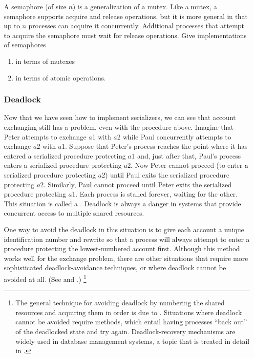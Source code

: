 \begin{exercise}
	\label{Exercise 3.47}
	A semaphore (of size \( n \)) is a generalization of a mutex.
	Like a mutex, a semaphore supports acquire and release operations, but it is more general in that up to \( n \) processes can acquire it concurrently.
	Additional processes that attempt to acquire the semaphore must wait for release operations.
	Give implementations of semaphores
	\begin{enumerate}[label = \alph*., leftmargin = *]

		\item
			in terms of mutexes

		\item
			in terms of atomic  operations.

	\end{enumerate}
\end{exercise}



\subsubsection*{Deadlock}

Now that we have seen how to implement serializers, we can see that account exchanging still has a problem, even with the  procedure above.
Imagine that Peter attempts to exchange \( a \)1 with \( a \)2 while Paul concurrently attempts to exchange \( a \)2 with \( a \)1.
Suppose that Peter’s process reaches the point where it has entered a serialized procedure protecting \( a \)1 and, just after that, Paul’s process enters a serialized procedure protecting \( a \)2.
Now Peter cannot proceed (to enter a serialized procedure protecting \( a \)2) until Paul exits the serialized procedure protecting \( a \)2.
Similarly, Paul cannot proceed until Peter exits the serialized procedure protecting \( a \)1.
Each process is stalled forever, waiting for the other.
This situation is called a .
Deadlock is always a danger in systems that provide concurrent access to multiple shared resources.

One way to avoid the deadlock in this situation is to give each account a unique identification number and rewrite  so that a process will always attempt to enter a procedure protecting the lowest-numbered account first.
Although this method works well for the exchange problem, there are other situations that require more sophisticated deadlock-avoidance techniques, or where deadlock cannot be avoided at all.
(See  and .)%
\footnote{
	The general technique for avoiding deadlock by numbering the shared resources and acquiring them in order is due to .
	Situations where deadlock cannot be avoided require  methods, which entail having processes “back out” of the deadlocked state and try again.
	Deadlock-recovery mechanisms are widely used in database management systems, a topic that is treated in detail in .
}



